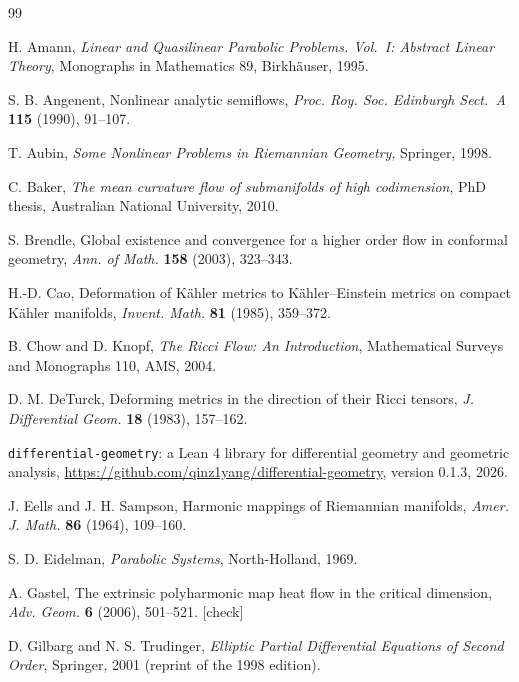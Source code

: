 \documentclass[11pt,reqno]{amsart}
\theoremstyle{definition}
\theoremstyle{remark}
\newcommand{\todo}[1]{\textcolor{red!70!black}{[#1]}}
\numberwithin{equation}{section}
\begin{document}
\begin{thebibliography}{99}

 H. Amann, \emph{Linear and Quasilinear Parabolic Problems. Vol.~I: Abstract Linear
Theory}, Monographs in Mathematics 89, Birkh\"auser, 1995.

 S. B. Angenent, Nonlinear analytic semiflows, \emph{Proc. Roy. Soc. Edinburgh
Sect.~A} \textbf{115} (1990), 91--107.

 T. Aubin, \emph{Some Nonlinear Problems in Riemannian Geometry}, Springer, 1998.

 C. Baker, \emph{The mean curvature flow of submanifolds of high codimension}, PhD
thesis, Australian National University, 2010.

 S. Brendle, Global existence and convergence for a higher order flow in conformal
geometry, \emph{Ann. of Math.} \textbf{158} (2003), 323--343.

 H.-D. Cao, Deformation of K\"ahler metrics to K\"ahler--Einstein metrics on compact
K\"ahler manifolds, \emph{Invent. Math.} \textbf{81} (1985), 359--372.

 B. Chow and D. Knopf, \emph{The Ricci Flow: An Introduction}, Mathematical Surveys
and Monographs 110, AMS, 2004.

 D. M. DeTurck, Deforming metrics in the direction of their Ricci tensors, \emph{J.
Differential Geom.} \textbf{18} (1983), 157--162.

 \texttt{differential-geometry}: a Lean 4 library for differential geometry and
geometric analysis, \url{https://github.com/qinz1yang/differential-geometry}, version 0.1.3, 2026.

 J. Eells and J. H. Sampson, Harmonic mappings of Riemannian manifolds,
\emph{Amer. J. Math.} \textbf{86} (1964), 109--160.

 S. D. Eidelman, \emph{Parabolic Systems}, North-Holland, 1969.

 A. Gastel, The extrinsic polyharmonic map heat flow in the critical dimension,
\emph{Adv. Geom.} \textbf{6} (2006), 501--521. \todo{check}

 D. Gilbarg and N. S. Trudinger, \emph{Elliptic Partial Differential Equations of Second
Order}, Springer, 2001 (reprint of the 1998 edition).


\end{thebibliography}
\end{document}
